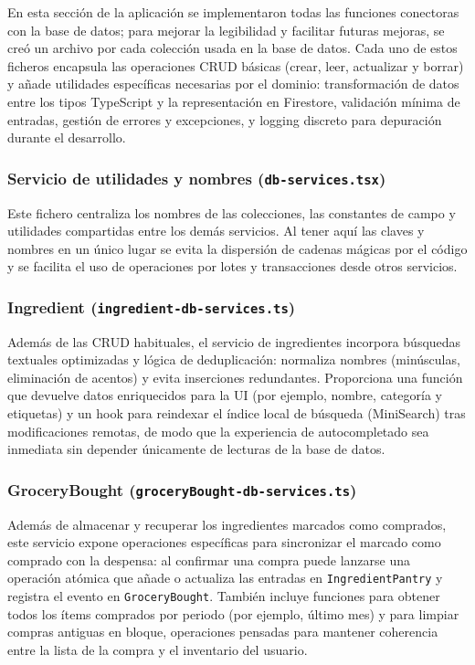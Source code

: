 \documentclass[twoside, openright, 11pt]{report}
\begin{document}
				En esta sección de la aplicación se implementaron todas las funciones conectoras con la base de datos; para mejorar la legibilidad y facilitar futuras mejoras, se creó un archivo por cada colección usada en la base de datos. Cada uno de estos ficheros encapsula las operaciones CRUD básicas (crear, leer, actualizar y borrar) y añade utilidades específicas necesarias por el dominio: transformación de datos entre los tipos TypeScript y la representación en Firestore, validación mínima de entradas, gestión de errores y excepciones, y logging discreto para depuración durante el desarrollo.
			
				\subsubsection{Servicio de utilidades y nombres (\texttt{db-services.tsx})}
				Este fichero centraliza los nombres de las colecciones, las constantes de campo y utilidades compartidas entre los demás servicios.  Al tener aquí las claves y nombres en un único lugar se evita la dispersión de cadenas mágicas por el código y se facilita el uso de operaciones por lotes y transacciones desde otros servicios.
				
				\subsubsection{Ingredient (\texttt{ingredient-db-services.ts})}
				Además de las CRUD habituales, el servicio de ingredientes incorpora búsquedas textuales optimizadas y lógica de deduplicación: normaliza nombres (minúsculas, eliminación de acentos) y evita inserciones redundantes. Proporciona una función que devuelve datos enriquecidos para la UI (por ejemplo, nombre, categoría y etiquetas) y un hook para reindexar el índice local de búsqueda (MiniSearch) tras modificaciones remotas, de modo que la experiencia de autocompletado sea inmediata sin depender únicamente de lecturas de la base de datos.
				
				\subsubsection{GroceryBought (\texttt{groceryBought-db-services.ts})}
				Además de almacenar y recuperar los ingredientes marcados como comprados, este servicio expone operaciones específicas para sincronizar el marcado como comprado con la despensa: al confirmar una compra puede lanzarse una operación atómica que añade o actualiza las entradas en \texttt{IngredientPantry} y registra el evento en \texttt{GroceryBought}. También incluye funciones para obtener todos los ítems comprados por periodo (por ejemplo, último mes) y para limpiar compras antiguas en bloque, operaciones pensadas para mantener coherencia entre la lista de la compra y el inventario del usuario.
				
\end{document}
